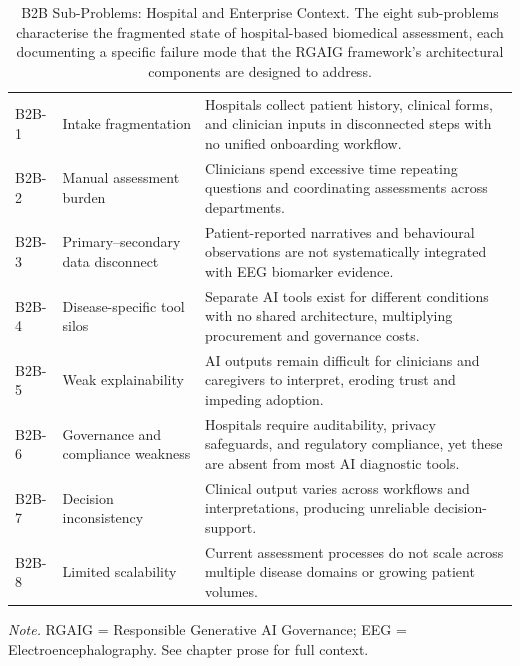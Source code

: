 {\tablestripes\tablefontsize
{}
\begin{xltabular}{\textwidth}{@{} >{\raggedright\arraybackslash}p{1.0cm} >{\raggedright\arraybackslash}p{4.3cm} p{9.0cm} @{}}
\caption[B2B Sub-Problems: Hospital and Enterprise Context]{B2B Sub-Problems: Hospital and Enterprise Context. The eight sub-problems characterise the fragmented state of hospital-based biomedical assessment, each documenting a specific failure mode that the RGAIG framework's architectural components are designed to address.}\label{tab:b2b_subproblems} \\
\toprule
\thead{\#} &  &  \\
\midrule
\endfirsthead
\endhead
\bottomrule
\endlastfoot
B2B-1 & Intake fragmentation & Hospitals collect patient history, clinical forms, and clinician inputs in disconnected steps with no unified onboarding workflow. \\
\addlinespace
B2B-2 & Manual assessment burden & Clinicians spend excessive time repeating questions and coordinating assessments across departments. \\
\addlinespace
B2B-3 & Primary--secondary data disconnect & Patient-reported narratives and behavioural observations are not systematically integrated with EEG biomarker evidence. \\
\addlinespace
B2B-4 & Disease-specific tool silos & Separate AI tools exist for different conditions with no shared architecture, multiplying procurement and governance costs. \\
\addlinespace
B2B-5 & Weak explainability & AI outputs remain difficult for clinicians and caregivers to interpret, eroding trust and impeding adoption. \\
\addlinespace
B2B-6 & Governance and compliance weakness & Hospitals require auditability, privacy safeguards, and regulatory compliance, yet these are absent from most AI diagnostic tools. \\
\addlinespace
B2B-7 & Decision inconsistency & Clinical output varies across workflows and interpretations, producing unreliable decision-support. \\
\addlinespace
B2B-8 & Limited scalability & Current assessment processes do not scale across multiple disease domains or growing patient volumes. \\
\end{xltabular}}
\vspace{0.3em}\noindent\textit{Note.} RGAIG = Responsible Generative AI Governance; EEG = Electroencephalography. See chapter prose for full context.

